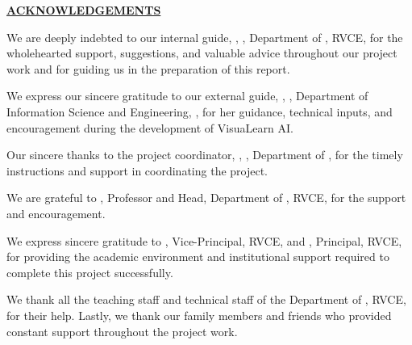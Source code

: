 \thispagestyle{empty}
\begin{center}
	\Large\textbf{\underline{ACKNOWLEDGEMENTS}} \par
\end{center}

We are deeply indebted to our internal guide, \textbf{\printGuideNameA}, \printGuideDesigA, Department of \printGuideDeptAInSF, RVCE, for the wholehearted support, suggestions, and valuable advice throughout our project work and for guiding us in the preparation of this report.\\ \par

We express our sincere gratitude to our external guide, \textbf{\printGuideNameB}, \printGuideDesigB, Department of Information Science and Engineering, \printGuideOrgB, for her guidance, technical inputs, and encouragement during the development of VisuaLearn AI.\\ \par

Our sincere thanks to the project coordinator, \textbf{\printProjectMemberA}, \printProjectMemberDesigA, Department of \printProjectMemberDeptAInSF, for the timely instructions and support in coordinating the project.\\ \par

We are grateful to \textbf{\printHOD}, Professor and Head, Department of \printDepartmentLF, RVCE, for the support and encouragement.\\ \par

We express sincere gratitude to \textbf{\printVicePrincipal}, Vice-Principal, RVCE, and \textbf{\printPrincipal}, Principal, RVCE, for providing the academic environment and institutional support required to complete this project successfully.\\ \par

We thank all the teaching staff and technical staff of the Department of \printDepartmentLF, RVCE, for their help. Lastly, we thank our family members and friends who provided constant support throughout the project work.\\ \par
